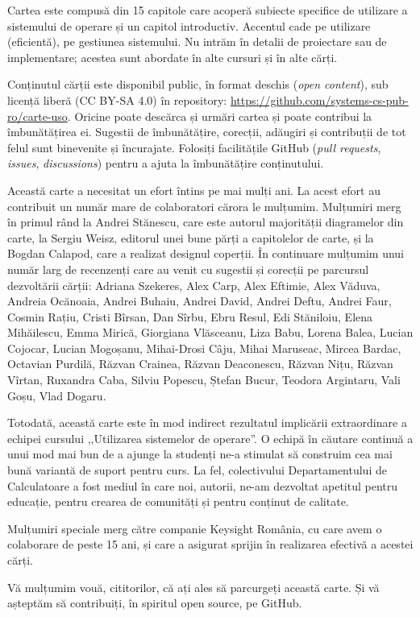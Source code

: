 Cartea este compusă din 15 capitole care acoperă subiecte specifice de utilizare a sistemului de operare și un capitol introductiv.
Accentul cade pe utilizare (eficientă), pe gestiunea sistemului.
Nu intrăm în detalii de proiectare sau de implementare; acestea sunt abordate în alte cursuri și în alte cărți.

Conținutul cărții este disponibil public, în format deschis (\textit{open content}), sub licență liberă (CC BY-SA 4.0) în repository: \url{https://github.com/systems-cs-pub-ro/carte-uso}.
Oricine poate descărca și urmări cartea și poate contribui la îmbunătățirea ei.
Sugestii de îmbunătățire, corecții, adăugiri și contribuții de tot felul sunt binevenite și încurajate.
Folosiți facilitățile GitHub (\textit{pull requests}, \textit{issues}, \textit{discussions}) pentru a ajuta la îmbunătățire conținutului.

Această carte a necesitat un efort întins pe mai mulți ani.
La acest efort au contribuit un număr mare de colaboratori cărora le mulțumim.
Mulțumiri merg în primul rând la Andrei Stănescu, care este autorul majorității diagramelor din carte, la Sergiu Weisz, editorul unei bune părți a capitolelor de carte, și la Bogdan Calapod, care a realizat designul coperții.
În continuare mulțumim unui număr larg de recenzenți care au venit cu sugestii și corecții pe parcursul dezvoltării cărții: Adriana Szekeres, Alex Carp, Alex Eftimie, Alex Văduva, Andreia Ocănoaia, Andrei Buhaiu, Andrei David, Andrei Deftu, Andrei Faur, Cosmin Rațiu, Cristi Bîrsan, Dan Sîrbu, Ebru Resul, Edi Stăniloiu, Elena Mihăilescu, Emma Mirică, Giorgiana Vlăsceanu, Liza Babu, Lorena Balea, Lucian Cojocar, Lucian Mogoșanu, Mihai-Drosi Câju, Mihai Maruseac, Mircea Bardac, Octavian Purdilă, Răzvan Crainea, Răzvan Deaconescu, Răzvan Nițu, Răzvan Vîrtan, Ruxandra Caba, Silviu Popescu, Ștefan Bucur, Teodora Argintaru, Vali Goșu, Vlad Dogaru.

Totodată, această carte este în mod indirect rezultatul implicării extraordinare a echipei cursului ,,Utilizarea sistemelor de operare''.
O echipă în căutare continuă a unui mod mai bun de a ajunge la studenți ne-a stimulat să construim cea mai bună variantă de suport pentru curs.
La fel, colectivului Departamentului de Calculatoare a fost mediul în care noi, autorii, ne-am dezvoltat apetitul pentru educație, pentru crearea de comunități și pentru conținut de calitate.

Mulțumiri speciale merg către companie Keysight România, cu care avem o colaborare de peste 15 ani, și care a asigurat sprijin în realizarea efectivă a acestei cărți.

Vă mulțumim vouă, cititorilor, că ați ales să parcurgeți această carte.
Și vă așteptăm să contribuiți, în spiritul open source, pe GitHub.
